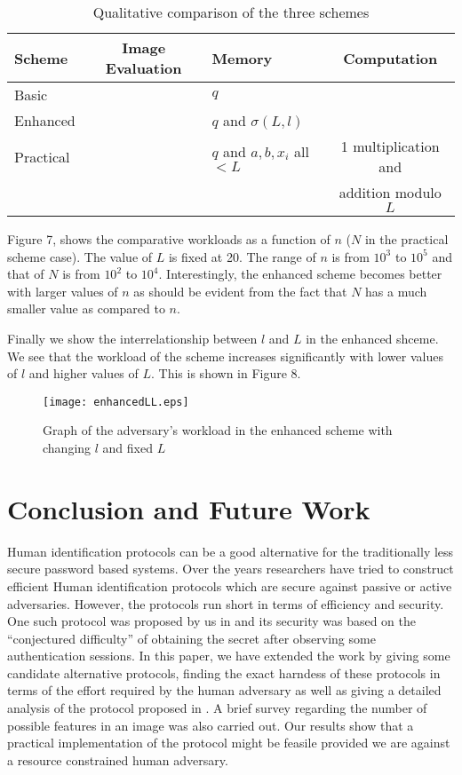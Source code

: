 \documentclass{llncs}
\newcommand{\tick}{\ding{52}}
\newcommand{\cross}{\ding{56}}
\begin{document}
\begin{table}
\caption{Qualitative comparison of the three schemes}
\begin{center}

\begin{tabular}{|l|c|l|c|}
\hline
Scheme&Image Evaluation&Memory&Computation\\
\hline
Basic& \tick & $q$ & \cross\\
Enhanced& \tick & $q$ and $\sigma \left( {L,l} \right)$& \cross\\
Practical& \tick & $q$ and $a,b,x_i$ all $ < L$& 1 multiplication and \\ &&& addition modulo $L$\\
\hline
\end{tabular}

\end{center}
\end{table}

Figure 7, shows the comparative workloads as a function of $n$ ($N$ in the practical scheme case). The value of $L$ is fixed at 20. The range of $n$ is from $10^3$ to $10^5$ and that of $N$ is from $10^2$ to $10^4$. Interestingly, the enhanced scheme becomes better with larger values of $n$ as should be evident from the fact that $N$ has a much smaller value as compared to $n$.

Finally we show the interrelationship between $l$ and $L$ in the enhanced shceme. We see that the workload of the scheme increases significantly with lower values of $l$ and higher values of $L$. This is shown in Figure 8.
\begin{figure}[ht]
\centerline{\texttt{[image: enhancedLL.eps]}}
\caption{Graph of the adversary's workload in the enhanced scheme with changing $l$ and fixed $L$}
\label{fig4}
\end{figure}
\section{Conclusion and Future Work}
Human identification protocols can be a good alternative for the traditionally less secure password based systems. Over the years researchers have tried to construct efficient Human identification protocols which are secure against passive or active adversaries. However, the protocols run short in terms of efficiency and security. One such protocol was proposed by us in \cite{hassan} and its security was based on the ``conjectured difficulty'' of obtaining the secret after observing some authentication sessions. In this paper, we have extended the work by giving some candidate alternative protocols, finding the exact harndess of these protocols in terms of the effort required by the human adversary as well as giving a detailed analysis of the protocol proposed in \cite{hassan}. A brief survey regarding the number of possible features in an image was also carried out. Our results show that a practical implementation of the protocol might be feasile provided we are against a resource constrained human adversary.
\end{document}

